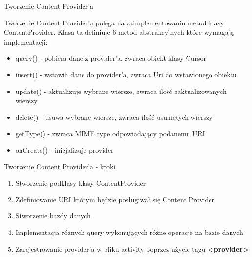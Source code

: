\documentclass{beamer}
\begin{document}
\begin{frame}{Tworzenie Content Provider'a}
	\begin{block}{}
		Tworzenie Content Provider'a polega na zaimplementowaniu metod klasy ContentProvider. Klasa ta definiuje 6 metod abstrakcyjnych które wymagają implementacji:
		\begin{itemize}
			\item query() - pobiera dane z provider'a, zwraca obiekt klasy Cursor
			\item insert() - wstawia dane do provider'a, zwraca Uri do wstawionego obiektu
			\item update() - aktualizuje wybrane wiersze, zwraca ilość zaktualizowanych wierszy
			\item delete() - usuwa wybrane wiersze, zwraca ilość usuniętych wierszy
			\item getType() - zwraca MIME type odpowiadający podanemu URI
			\item onCreate() - inicjalizuje provider
		\end{itemize}
	\end{block}
\end{frame}

\begin{frame}{Tworzenie Content Provider'a - kroki}
	\begin{enumerate}
		\item Stworzenie podklasy klasy ContentProvider
		\item Zdefiniowanie URI którym będzie posługiwał się Content Provider
		\item Stworzenie bazdy danych
		\item Implementacja różnych query wykonujących różne operacje na bazie danych
		\item Zarejestrowanie provider'a w pliku activity poprzez użycie tagu \textbf{<provider>}
	\end{enumerate}
\end{frame}
\end{document}
